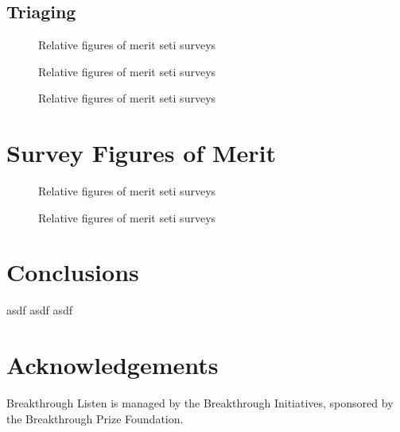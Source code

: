 \documentclass[onecolumn]{aastex62}
\begin{document}
\subsection{Triaging}
\lipsum
\begin{figure*}[ht!]
\caption{Relative figures of merit seti surveys\label{fig:f1}}
\end{figure*}

\begin{figure*}[ht!]
\caption{Relative figures of merit seti surveys\label{fig:f2}}
\end{figure*}

\begin{figure*}[ht!]
\caption{Relative figures of merit seti surveys\label{fig:f3}}
\end{figure*}

\section{Survey Figures of Merit}
\lipsum



\begin{figure*}[ht!]
\caption{Relative figures of merit seti surveys\label{fig:f4}}
\end{figure*}

\begin{figure*}[ht!]
\caption{Relative figures of merit seti surveys\label{fig:f5}}
\end{figure*}

\lipsum


%
\section{Conclusions}
asdf asdf asdf

\section{Acknowledgements}
Breakthrough Listen is managed by the Breakthrough Initiatives, sponsored by the Breakthrough Prize Foundation.




\nocite{*}


\end{document}
